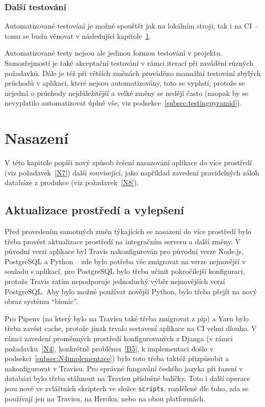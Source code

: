 \subsection{Další testování}

Automatizované testování je možné spouštět jak na lokálním stroji, tak i na CI -- tomu se budu věnovat v následující kapitole~\ref{chap:nasazeni}.

Automatizované testy nejsou ale jedinou formou testování v projektu. Samozřejmostí je také akceptační testování v rámci iterací při zavádění různých požadavků. Dále je též při větších změnách prováděno manuální testování zbylých průchodů v aplikaci, které nejsou automatizovány, toto se vyplatí, protože se nejedná o průchody nejdůležitější a velké změny se nedějí často (naopak by se nevyplatilo automatizovat úplně vše, viz podsekce~\ref{subsec:testingpyramid}).

\chapter{Nasazení}\label{chap:nasazeni}

V této kapitole popíši nový způsob řešení nasazování aplikace do více prostředí (viz požadavek~\ref{N7}) další související, jako například zavedení pravidelných záloh databáze z produkce (viz požadavek~\ref{N8}).

\section{Aktualizace prostředí a vylepšení}

Před provedením samotných změn týkajících se nasazení do více prostředí bylo třeba provést aktualizace prostředí na integračním serveru a další změny. V původní verzi aplikace byl Travis nakonfigurován pro původní verze Node.js, PostgreSQL a Python -- zde bylo potřeba vše zmigrovat na verze nejnovější v souladu s aplikací, pro PostgreSQL bylo třeba učinit pokročilejší konfiguraci, protože Travis zatím nepodporuje jednoduchý výběr nejnovějších verzí PostgreSQL. Aby bylo možné používat novější Python, bylo třeba přejít na nový obraz systému \enquote{bionic}.

Pro Pipenv (na který bylo na Travisu také třeba zmigrovat z pip) a Yarn bylo třeba zavést cache, protože jinak trvalo sestavení aplikace na CI velmi dlouho. V rámci zavedení proměnných prostředí konfigurovaných z Djanga (v rámci požadavku~\ref{N4}, konkrétně problému~\ref{B5}, k implementaci došlo v podsekci~\ref{subsec:N4implementace}) bylo toto třeba taktéž přizpůsobit a nakonfigurovat v Travisu. Pro správné fungování českého jazyka při řazení v databázi bylo třeba stáhnout na Travisu příslušné balíčky. Toto i další operace jsou nově ve zvláštních skriptech ve složce \verb|scripts|, rozdělené dle toho, zda se používají jen na Travisu, na Heroku, nebo na obou platformách.

